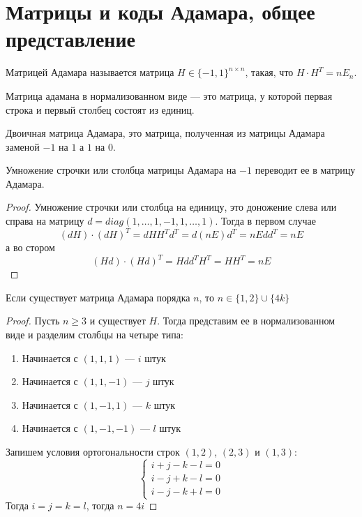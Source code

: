 
\section{Матрицы и коды Адамара, общее представление}

\begin{definition}
Матрицей Адамара называется матрица $H \in \{-1,1\}^{n \times n}$, такая,
что $H \cdot H^{T} = n E_n$.

Матрица адамана в нормализованном виде --- это матрица, у которой первая
строка и первый столбец состоят из единиц.

Двоичная матрица Адамара, это матрица, полученная из матрицы Адамара 
заменой $-1$ на $1$ а $1$ на $0$.
\end{definition}

\begin{proposition}
Умножение строчки или столбца матрицы Адамара на $-1$ переводит
ее в матрицу Адамара.
\end{proposition}

\begin{proof}
 Умножение строчки или столбца на единицу, это доножение слева или
 справа на матрицу $d = diag(1,\ldots,1, -1, 1, \ldots, 1)$.
 Тогда в первом случае 
  $$(d H) \cdot (d H)^{T} = d H H^{T} d^T = d (n E) d^{T} = n E d d^{T} = n E$$
 а во стором
 $$(H d) \cdot (H d)^{T} = H d d^{T} H^{T} = H H^{T} = n E$$ 
\end{proof}

\begin{theorem}
Если существует матрица Адамара порядка $n$, то $n \in \{1,2\} \cup \{4k\}$
\end{theorem}

\begin{proof}
Пусть $n \ge 3$ и существует $H$. Тогда представим ее в нормализованном виде
и разделим столбцы на четыре типа:
\begin{enumerate}
\item Начинается с $(1,1,1)$ --- $i$ штук
\item Начинается с $(1,1,-1)$ --- $j$ штук
\item Начинается с $(1,-1,1)$ --- $k$ штук
\item Начинается с $(1,-1,-1)$ --- $l$ штук
\end{enumerate}
Запишем условия ортогональности строк $(1,2)$, $(2,3)$ и $(1,3)$:
$$\left\{\begin{array}{l}
           i+j -k-l = 0 \\
           i-j + k -l = 0 \\
           i-j-k+l = 0
         \end{array}\right.$$
Тогда $i=j=k=l$, тогда $n = 4i$         
\end{proof}

